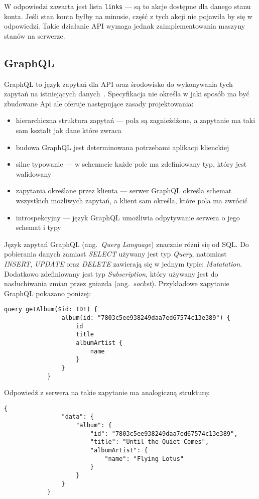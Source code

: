 		W odpowiedzi zawarta jest lista \verb|links| --- są to akcje dostępne dla danego stanu konta.
		Jeśli stan konta byłby na minusie, część z tych akcji nie pojawiła by się w odpowiedzi.
		Takie działanie API wymaga jednak zaimplementowania maszyny stanów na serwerze.

	\subsection{GraphQL}
		GraphQL to język zapytań dla API oraz środowisko do wykonywania tych zapytań na istniejących danych~\cite{GQLsite}.
		Specyfikacja nie określa w jaki sposób ma być zbudowane Api ale oferuje następujące zasady projektowania\cite{GQLspec}:
		\begin{itemize}
			\item hierarchiczna struktura zapytań --- pola są zagnieżdżone, a zapytanie ma taki sam kształt jak dane które zwraca
			\item budowa GraphQL jest determinowana potrzebami aplikacji klienckiej
			\item silne typowanie --- w schemacie każde pole ma zdefiniowany typ, który jest walidowany
			\item zapytania określane przez klienta --- serwer GraphQL określa schemat wszystkich możliwych zapytań,
				a klient sam określa, które pola ma zwrócić
			\item introspekcyjny --- język GraphQL umożliwia odpytywanie serwera o jego schemat i typy
		\end{itemize}

		Język zapytań GraphQL (ang.\ \emph{Query Language}) znacznie różni się od SQL.
		Do pobierania danych zamiast \emph{SELECT} używany jest typ \emph{Query},
		natomiast \emph{INSERT}, \emph{UPDATE} oraz \emph{DELETE} zawierają się w jednym typie: \emph{Mutatation}.
		Dodatkowo zdefiniowany jest typ \emph{Subscription}, który używany jest do nasłuchiwania zmian przez gniazda (ang.\ \emph{socket}).
		Przykładowe zapytanie GraphQL pokazano poniżej:

		\begin{lstlisting}[label=lst:gqlQuery]
			query getAlbum($id: ID!) {
				album(id: "7803c5ee938249daa7ed67574c13e389") {
					id
					title
					albumArtist {
						name
					}
				}
			}
		\end{lstlisting}
		
		Odpowiedź z serwera na takie zapytanie ma analogiczną strukturę:

		\begin{lstlisting}[label=lst:gqlQueryRes]
			{
				"data": {
					"album": {
						"id": "7803c5ee938249daa7ed67574c13e389",
						"title": "Until the Quiet Comes",
						"albumArtist": {
							"name": "Flying Lotus"
						}
					}
				}
			}
		\end{lstlisting}

